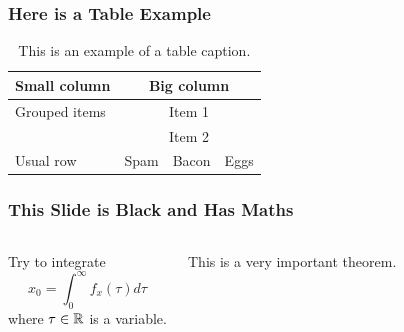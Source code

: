 \documentclass[fleqn]{qu-slides}
\begin{document}

\SlideWhite
\begin{frame}
    \frametitle{Here is a Table Example}
    \begin{table}
        \caption{This is an example of a table caption.}
        \flushleft
        \begin{tabular}{lccc}
            \toprule
                \bf Small column & \multicolumn{3}{c}{\bf Big column} \\
            \midrule
                Grouped items & \multicolumn{3}{c}{Item 1} \\
            \cmidrule{2-4}
                & \multicolumn{3}{c}{Item 2} \\
            \midrule
                Usual row & Spam & Bacon & Eggs \\
            \bottomrule
        \end{tabular}
    \end{table}
\end{frame}




\SlideBlack
\begin{frame}
    \frametitle{This Slide is Black and Has Maths}
    \begin{columns}
        Try to integrate
        \begin{equation}
            x_0=\int_0^\infty f_x(\tau)d\tau
        \end{equation}
        where $\tau\in\mathbb R$ is a variable.
        \begin{thm}
            This is a very important theorem.
        \end{thm}
    \end{columns}
\end{frame}

\end{document}
